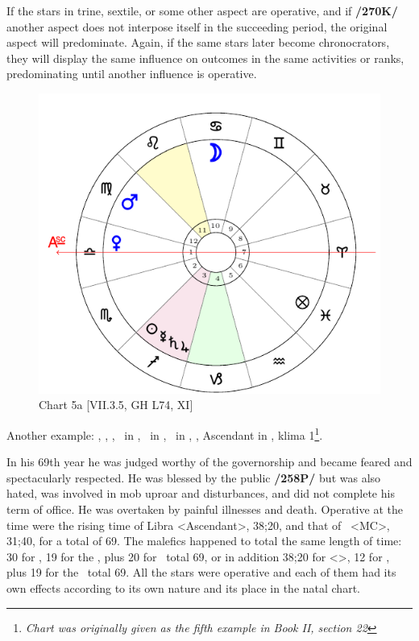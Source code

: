 If the stars in trine, sextile, or some other aspect are operative, and if \textbf{/270K/} another aspect does not interpose itself in the succeeding period, the original aspect will predominate. Again, if the same stars later become chronocrators, they will display the same influence on outcomes in the same activities or ranks, predominating until another influence is operative.

\begin{figure}
\centering
\vspace{-20pt}
\includegraphics[width=.68\textwidth]{charts/2_21_5}
\caption{Chart 5a [VII.3.5, GH L74, XI]}
\label{fig:chart5a}
\end{figure} 

Another example: \Sun, \Saturn, \Jupiter, \Mercury\, in \Sagittarius, \Moon\, in \Cancer, \Mars\, in \Virgo,
\Venus, Ascendant in \Libra, klima 1\footnote{\textit{Chart was originally given as the fifth example in Book II, section 22}}.

In his 69th year he was judged worthy of the governorship and became feared and spectacularly respected. He was blessed by the public \textbf{/258P/} but was also hated, was involved in mob uproar and disturbances, and did not complete his term of office. He was overtaken by painful illnesses and death. Operative at the time were the rising time of Libra <Ascendant>, 38;20, and
that of \Cancer\, <MC>, 31;40, for a total of 69. The malefics happened to total the same length of time: 30 for \Saturn, 19 for the \Sun, plus 20 for \Mercury\, total 69, or in addition 38;20 for \Virgo <\Mars>, 12 for \Jupiter, plus 19 for the \Sun\, total 69. All the stars were operative and each of them had its own effects according to its own nature and its place in the natal chart.

